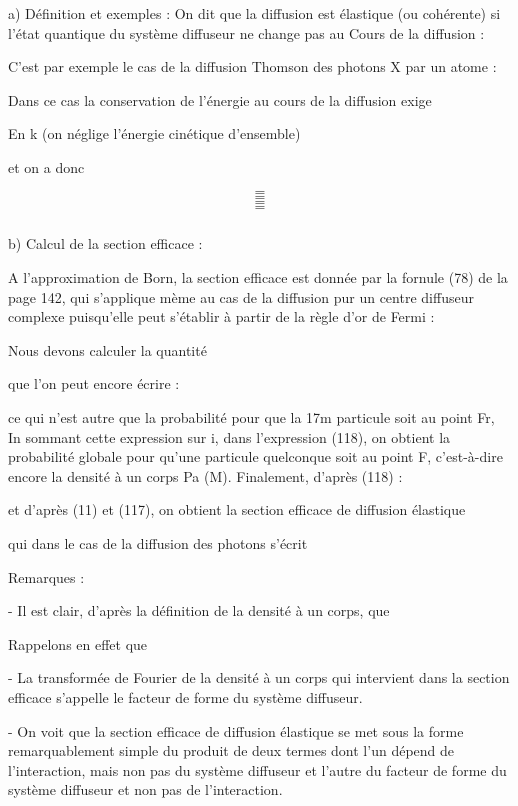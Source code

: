 \subsubsection{}%
a) Définition et exemples :
On dit que la diffusion est élastique (ou cohérente) si l'état quantique du système
diffuseur ne change pas au Cours de la diffusion :

C'est par exemple le cas de la diffusion Thomson des photons X par un atome :

Dans ce cas la conservation de l'énergie au cours de la diffusion exige

 En k (on néglige l'énergie cinétique d'ensemble)

et on a donc

%
\[
\tag{117}=
\]
\[
\tag{118}=
\]
\[
\tag{119}=
\]
\[
\tag{120}=
\]

\subsubsection{}%
b) Calcul de la section efficace :

A l'approximation de Born, la section efficace est donnée par
la fornule (78) de la page 142, qui s'applique mème au cas de la diffusion
pur un centre diffuseur complexe puisqu'elle peut s'établir à partir de la
règle d'or de Fermi :

Nous devons calculer la quantité

que l'on peut encore écrire :

ce qui n'est autre que la probabilité pour que la 17m particule soit au point
Fr, In sommant cette expression sur i, dans l'expression (118), on obtient la
probabilité globale pour qu'une particule quelconque soit au point F, c'est-à-dire
encore la densité à un corps Pa (M). Finalement, d'après (118) :

et d'après (11) et (117), on obtient la section efficace de diffusion élastique

qui dans le cas de la diffusion des photons s'écrit


Remarques :

- Il est clair, d'après la définition de la densité à un corps, que

 Rappelons en effet que

- La transformée de Fourier de la densité à un corps qui intervient dans la
section efficace s'appelle le facteur de forme du système diffuseur.

- On voit que la section efficace de diffusion élastique se met sous la forme
remarquablement simple du produit de deux termes dont l'un dépend de l'interaction,
mais non pas du système diffuseur et l'autre du facteur de forme
du système diffuseur et non pas de l'interaction.


